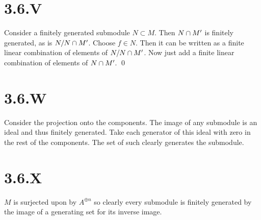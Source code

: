 \documentclass{article}
\begin{document}
\section{3.6.V}
Consider a finitely generated submodule $N \subset M$. Then $N \cap M'$ is finitely generated, as is $N/N \cap M'$. Choose $f \in N$. Then it can be written as a finite linear combination of elements of $N/N \cap M'$. Now just add a finite linear combination of elements of $N \cap M'$. \qed

\section{3.6.W}
Consider the projection onto the components. The image of any submodule is an ideal and thus finitely generated. Take each generator of this ideal with zero in the rest of the components. The set of such clearly generates the submodule.

\section{3.6.X}
$M$ is surjected upon by $A^{\oplus n}$ so clearly every submodule is finitely generated by the image of a generating set for its inverse image.
\end{document}
